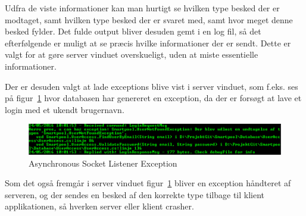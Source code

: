 Udfra de viste informationer kan man hurtigt se hvilken type besked der er modtaget, samt hvilken type besked der er svaret med, samt hvor meget denne besked fylder. Det fulde output bliver desuden gemt i en log fil, så det efterfølgende er muligt at se præcis hvilke informationer der er sendt. Dette er valgt for at gøre server vinduet overskueligt, uden at miste essentielle informationer.

Der er desuden valgt at lade exceptions blive vist i server vinduet, som f.eks. ses på figur~\ref{fig:asynchronousSocketListenerException} hvor databasen har genereret en exception, da der er forsøgt at lave et login med et ukendt brugernavn.

\begin{figure}
	\centering
	\includegraphics[width=0.7\linewidth]{figs/connection/asynchronousSocketListenerException.png}
	\caption{Asynchronous Socket Listener Exception}
	\label{fig:asynchronousSocketListenerException}
\end{figure}

Som det også fremgår i server vinduet figur~\ref{fig:asynchronousSocketListenerException} bliver en exception håndteret af serveren, og der sendes en besked af den korrekte type tilbage til klient applikationen, så hverken server eller klient crasher.

